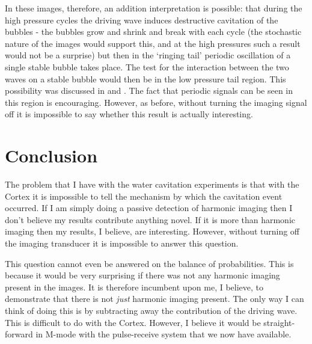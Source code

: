 In these images, therefore, an addition interpretation is possible: that during the high pressure cycles 
the driving wave induces destructive cavitation of the bubbles - the bubbles grow and shrink and break with each cycle
(the stochastic nature of the images would support this, and at the high pressures such a result would not be a surprise)
but then in the  `ringing tail' periodic oscillation of a single stable bubble takes place. 
The test for the interaction between the two waves on a stable bubble would then be in the low pressure tail region.
This possibility was discussed in  and .
The fact that periodic signals can be seen in this region is encouraging.
However, as before, without turning the imaging signal off it is impossible to say whether this result is actually interesting.


\section{Conclusion}
The problem that I have with the water cavitation experiments is that with the Cortex it is impossible to tell the mechanism  by which the cavitation event occurred.
If I am simply doing a passive detection of harmonic imaging then I don't believe my results contribute anything novel.
If it is more than harmonic imaging then my results, I believe, are interesting.
However, without turning off the imaging transducer it is impossible to answer this question.

This question cannot even be answered on the balance of probabilities.
This is because it would be very surprising if there was not any harmonic imaging present in the images.
It is therefore incumbent upon me, I believe, to demonstrate that there is not {\em just} harmonic imaging present.
The only way I can think of doing this is by subtracting away the contribution of the  driving wave. %
This is difficult to do with the Cortex.
However, I believe it would be straight-forward in M-mode with the pulse-receive system that we now have available.






